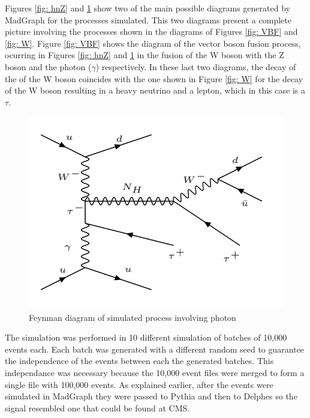 Figures \ref{fig: hnZ} and \ref{fig: hnGamma} show two of the main possible diagrams generated by MadGraph for the processes simulated. This two diagrams present a complete picture involving the processes shown in the diagrams of Figures \ref{fig: VBF} and \ref{fig: W}. Figure \ref{fig: VBF} shows the diagram of the vector boson fusion process, ocurring in Figures \ref{fig: hnZ} and \ref{fig: hnGamma} in the fusion of the W boson with the Z boson and the photon ($\gamma$) respectively. In these last two diagrams, the decay of the of the W boson coincides with the one shown in Figure \ref{fig: W} for the decay of the W boson resulting in a heavy neutrino and a lepton, which in this case is a $\tau$.

\begin{figure}[H]
\centering
\includegraphics[scale = 0.45]{Figures/Feynman_hnGamma}
\caption{Feynman diagram of simulated process involving photon}
\label{fig: hnGamma}
\end{figure}

The simulation was performed in 10 different simulation of batches of 10,000 events each. Each batch was generated with a different random seed to guarantee the independence of the events between each the generated batches. This independance was necessary because the 10,000 event files were merged to form a single file with 100,000 events. As explained earlier, after the events were simulated in MadGraph they were passed to Pythia and then to Delphes so the signal resembled one that could be found at CMS.  

